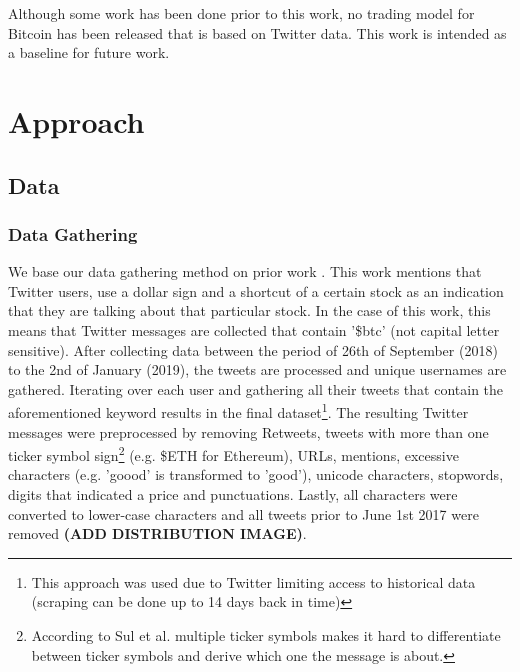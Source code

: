 \documentclass{article}
\begin{document}
Although some work has been done prior to this work, no trading model for Bitcoin has been released that is based on Twitter data. This work is intended as a baseline for future work.

\section{Approach}
\subsection{Data}
\subsubsection{Data Gathering}
We base our data gathering method on prior work \cite{sul2017trading}. This work mentions that Twitter users, use a dollar sign and a shortcut of a certain stock as an indication that they are talking about that particular stock. In the case of this work, this means that Twitter messages are collected that contain '\$btc' (not capital letter sensitive). After collecting data between the period of 26th of September (2018) to the 2nd of January (2019), the tweets are processed and unique usernames are gathered. Iterating over each user and gathering all their tweets that contain the aforementioned keyword results in the final dataset\footnote{This approach was used due to Twitter limiting access to historical data (scraping can be done up to 14 days back in time)}. The resulting Twitter messages were preprocessed by removing Retweets, tweets with more than one ticker symbol sign\footnote{According to Sul et al. \cite{sul2017trading} multiple ticker symbols makes it hard to differentiate between  ticker symbols and derive which one the message is about.} (e.g. \$ETH for Ethereum), URLs, mentions, excessive characters (e.g. 'goood' is transformed to 'good'), unicode characters, stopwords, digits that indicated a price and punctuations. Lastly, all characters were converted to lower-case characters and all tweets prior to June 1st 2017 were removed \textbf{(ADD DISTRIBUTION IMAGE)}. 
\end{document}
